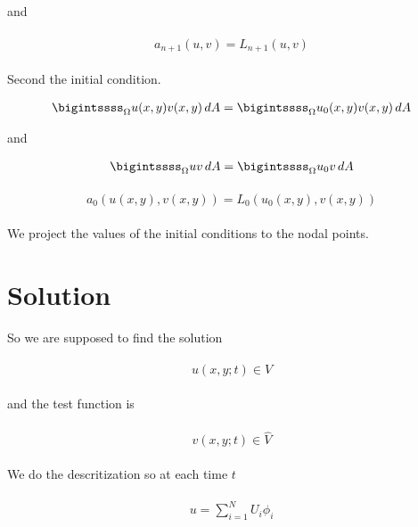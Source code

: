 \documentclass{article}
\begin{document}
	and
	
	\begin{gather}
	\begin{split}
	a_{n+1}(u,v) = L_{n+1}(u,v)
	\end{split}
	\end{gather}
	
	
	Second the initial condition.
	
	\begin{gather}
	\begin{split}
	\bigintssss_{\Omega} u(x,y)v(x,y)\,dA = \bigintssss_{\Omega} u_0(x,y)v(x,y)\,dA
	\end{split}
	\end{gather}
	
	and
	
	\begin{gather}
	\begin{split}
	\bigintssss_{\Omega} uv\,dA = \bigintssss_{\Omega} u_0v\,dA
	\end{split}
	\end{gather}
	
	
	\begin{gather}
	\begin{split}
		a_0(u(x,y),v(x,y)) = L_0(u_0(x,y),v(x,y))
	\end{split}
	\end{gather}
	
	We project the values of the initial conditions to the nodal points.
	
	\section*{Solution}
	
	So we are supposed to find the solution
	
	\begin{gather}
	\begin{split}
	u(x,y;t) \in V 
	\end{split}
	\end{gather}
	
	and the test function is
	
	\begin{gather}
	\begin{split}
	v(x,y;t) \in \hat{V}
	\end{split}
	\end{gather}
	
	We do the descritization so at each time $t$
	
	
	\begin{gather}
	\begin{split}
		u = \sum_{i=1}^{N}U_i\phi_i
	\end{split}
	\end{gather}
	
\end{document}
